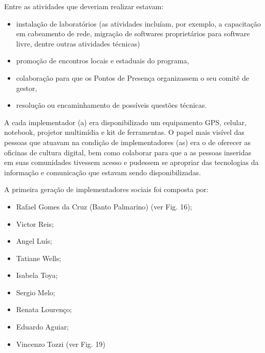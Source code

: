Entre as atividades que deveriam realizar estavam:


\begin{itemize}
\item instalação de laboratórios (as atividades incluíam, por exemplo, a capacitação em cabeamento de rede, migração de softwares proprietários para software livre, dentre outras atividades técnicas)
\item promoção de encontros locais e estaduais do programa,
\item colaboração para que os  Pontos de Presença organizassem o seu comitê de gestor,
\item resolução ou encaminhamento de possíveis questões técnicas.
\end{itemize}

A cada implementador (a) era disponibilizado um equipamento GPS, celular, notebook, projetor multimídia e kit de ferramentas. O papel mais visível das pessoas que atuavam na condição de implementadores (as) era o de oferecer as oficinas de cultura digital, bem como colaborar para que a as pessoas inseridas em suas comunidades tivessem acesso e pudessem se apropriar das tecnologias da informação e comunicação que estavam sendo disponibilizadas.


\noindent\begin{flushright}\mbox{\linespread{1}\selectfont\centering{}}\end{flushright}


A  primeira geração de implementadores  sociais foi composta por:


\begin{itemize}
\item Rafael Gomes da Cruz (Banto Palmarino) (ver Fig. 16);
\item Victor Reis;
\item Angel Luís;
\item Tatiane Wells;
\item Isabela Toya;
\item Sergio Melo;
\item Renata Lourenço;
\item Eduardo Aguiar;
\item Vincenzo Tozzi (ver Fig. 19)
\end{itemize}


